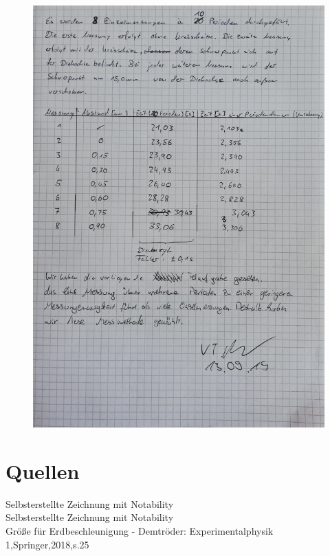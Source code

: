 \documentclass[11pt,a4paper]{article}
\begin{document}
\begin{figure}[H]
	\includegraphics[width=1\linewidth]{S3.jpg}
	\centering
\end{figure}
\newpage
\section{Quellen}
\text{[1]}  \hspace{2cm} Selbsterstellte Zeichnung mit Notability\\
\text{[2]} \hspace{2cm} Selbsterstellte Zeichnung mit Notability\\
\text{[3]} \hspace{2cm} Größe für Erdbeschleunigung - Demtröder: Experimentalphysik 1,Springer,2018,s.25
%


%
\end{document}
